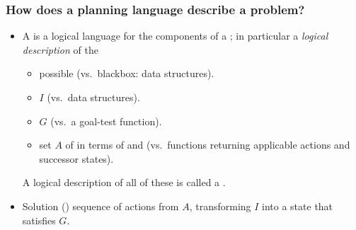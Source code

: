 \documentclass[notes,mh]{mikoslides}
\begin{document}
\begin{module}[id=planning-task]

\begin{frame}
  \frametitle{How does a planning language describe a problem?}
  \begin{itemize}
  \item
    \begin{definition}
      A  is a logical language for the components of a
      ; in particular a \emph{logical description}
      of the 
      \begin{itemize}
      \item<1-> possible  (vs.\ blackbox: data
        structures). 
      \item<2->  $I$ (vs.\ data structures).
      \item<3->  $G$ (vs.\ a goal-test
        function). 
      \item<4-> set $A$ of  in terms of
         and  (vs.\ functions returning applicable
        actions and successor states).  
      \end{itemize}
      A logical description of all of these is called a .
    \end{definition}
  \item
    \begin{definition}
      Solution () \hateq sequence of actions from $A$, transforming $I$ into a
      state that satisfies $G$. 
    \end{definition}
  \end{itemize}
\end{frame}
\end{module}
\end{document}
